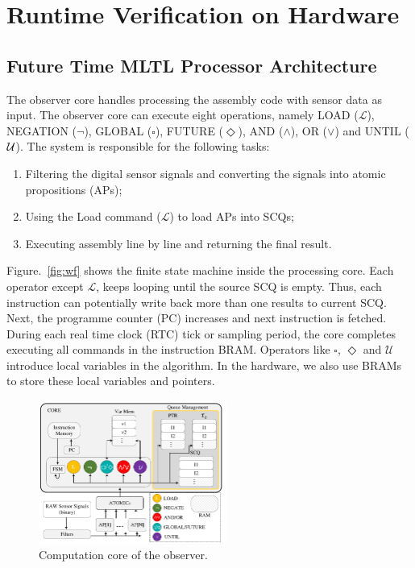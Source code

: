 \chapter{\mltl Runtime Verification on Hardware}

\section{Future Time MLTL Processor Architecture}

The \mltl observer core handles processing the assembly code with sensor data as input. The observer core can execute eight \mltl operations, namely LOAD ($\mathcal{L}$), NEGATION ($\neg$), GLOBAL ($\square$), FUTURE ($\Diamond$), AND ($\wedge$), OR ($\vee$) and UNTIL (${\mathcal{U}}$). The system is responsible for the following tasks:
\begin{enumerate}
  \item Filtering the digital sensor signals and converting the signals into atomic propositions (APs);
  \item Using the Load command ($\mathcal{L}$) to load APs into SCQs;
  \item Executing assembly line by line and returning the final result.
\end{enumerate}

Figure.~\ref{fig:wf} shows the finite state machine inside the processing core. Each operator except $\mathcal{L}$, keeps looping until the source SCQ is empty. Thus, each instruction can potentially write back more than one results to current SCQ. Next, the programme counter (PC) increases and next instruction is fetched. During each real time clock (RTC) tick or sampling period, the core completes executing all commands in the instruction BRAM. Operators like $\square$, $\Diamond$ and $\mathcal{U}$ introduce local variables in the algorithm. In the hardware, we also use BRAMs to store these local variables and pointers.\\
\begin{figure}
\centering
\includegraphics[width=0.55\textwidth]{fig/core.pdf}
\caption{\label{fig:core}Computation core of the observer.}
\end{figure}

